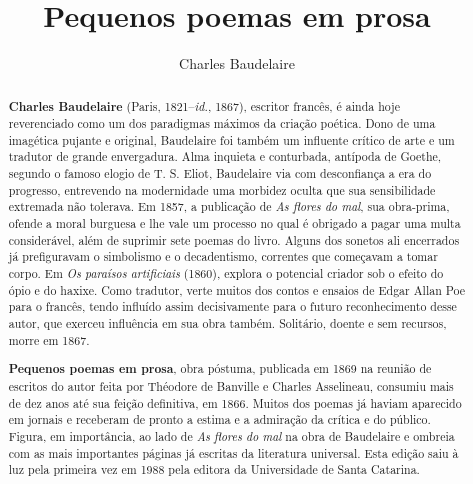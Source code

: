 \documentclass[12pt]{extarticle}
\begin{document}
\newcommand{\AutorLivro}{Charles Baudelaire}
\newcommand{\TituloLivro}{Pequenos poemas em prosa}
\newcommand{\Tema}{Ficção, mistério e fantasia}
\newcommand{\Genero}{Poema}
\newcommand{\imagemCapa}{./images/PNLD0010-01.png}
\newcommand{\issnppub}{978-65-994412-1-9}
\newcommand{\colaborador}{Bruno Gradella\\ e Vicente Castro}


\title{\TituloLivro}
\author{\AutorLivro}
\def\authornotes{\colaborador}

\date{}
\maketitle


\begin{abstract}

\textbf{Charles Baudelaire} (Paris, 1821--\textit{id.}, 1867), escritor francês, é
 ainda hoje reverenciado como um dos paradigmas máximos da criação poética.
 Dono de uma imagética pujante e original, Baudelaire foi também um
 influente crítico de arte e um tradutor de grande envergadura. Alma
 inquieta e conturbada, antípoda de Goethe, segundo o famoso elogio de
 T. S. Eliot, Baudelaire via com desconfiança a era do progresso,
 entrevendo na modernidade uma morbidez oculta que sua sensibilidade
 extremada não tolerava. Em 1857, a publicação de \textit{As flores do mal}, sua
 obra-prima, ofende a moral burguesa e lhe vale um processo no qual é
 obrigado a pagar uma multa considerável, além de suprimir sete poemas do livro.
 Alguns dos sonetos ali encerrados
 já prefiguravam o simbolismo e o decadentismo, correntes que começavam a
 tomar corpo. Em \textit{Os paraísos artificiais} (1860), explora o potencial
 criador sob o efeito do ópio e do haxixe. Como tradutor, verte
 muitos dos contos e ensaios de  Edgar Allan Poe para o francês, tendo influído assim decisivamente
 para o futuro reconhecimento desse autor, que 
 exerceu influência em sua obra também. Solitário, doente e sem recursos,
 morre em 1867.

\textbf{Pequenos poemas em prosa}, obra póstuma, publicada em 1869 na reunião
 de escritos do autor feita por Théodore de Banville e Charles Asselineau,
 consumiu mais de dez anos até sua feição definitiva, em 1866. Muitos dos poemas
 já haviam aparecido em jornais e receberam de pronto a estima e a
 admiração da crítica e do público. Figura, em importância, ao lado de
 \textit{As flores do mal} na obra de Baudelaire e ombreia com
 as mais importantes páginas já escritas da literatura universal. Esta edição
saiu à luz pela primeira vez em 1988 pela editora da Universidade de Santa Catarina.

\end{abstract}
\end{document}

